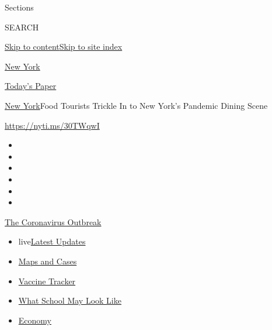 Sections

SEARCH

\protect\hyperlink{site-content}{Skip to
content}\protect\hyperlink{site-index}{Skip to site index}

\href{https://www.nytimes.com/section/nyregion}{New York}

\href{https://myaccount.nytimes.com/auth/login?response_type=cookie\&client_id=vi}{}

\href{https://www.nytimes.com/section/todayspaper}{Today's Paper}

\href{/section/nyregion}{New York}\textbar{}Food Tourists Trickle In to
New York's Pandemic Dining Scene

\url{https://nyti.ms/30TWqwI}

\begin{itemize}
\item
\item
\item
\item
\item
\item
\end{itemize}

\href{https://www.nytimes.com/news-event/coronavirus?action=click\&pgtype=Article\&state=default\&region=TOP_BANNER\&context=storylines_menu}{The
Coronavirus Outbreak}

\begin{itemize}
\tightlist
\item
  live\href{https://www.nytimes.com/2020/08/01/world/coronavirus-covid-19.html?action=click\&pgtype=Article\&state=default\&region=TOP_BANNER\&context=storylines_menu}{Latest
  Updates}
\item
  \href{https://www.nytimes.com/interactive/2020/us/coronavirus-us-cases.html?action=click\&pgtype=Article\&state=default\&region=TOP_BANNER\&context=storylines_menu}{Maps
  and Cases}
\item
  \href{https://www.nytimes.com/interactive/2020/science/coronavirus-vaccine-tracker.html?action=click\&pgtype=Article\&state=default\&region=TOP_BANNER\&context=storylines_menu}{Vaccine
  Tracker}
\item
  \href{https://www.nytimes.com/interactive/2020/07/29/us/schools-reopening-coronavirus.html?action=click\&pgtype=Article\&state=default\&region=TOP_BANNER\&context=storylines_menu}{What
  School May Look Like}
\item
  \href{https://www.nytimes.com/live/2020/07/31/business/stock-market-today-coronavirus?action=click\&pgtype=Article\&state=default\&region=TOP_BANNER\&context=storylines_menu}{Economy}
\end{itemize}

